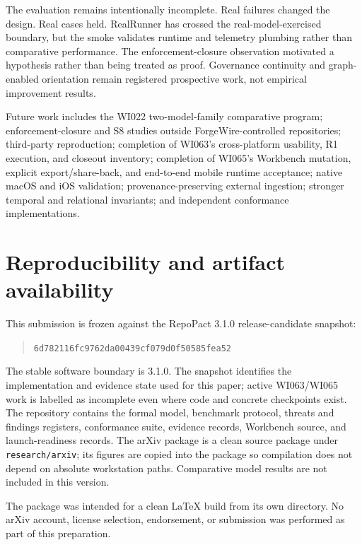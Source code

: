 \documentclass[11pt]{article}
\newcommand{\snapshot}{\texttt{6d782116fc9762da00439cf079d0f50585fea52}}
\begin{document}
The evaluation remains intentionally incomplete. Real failures changed the design. Real
cases held. RealRunner has crossed the real-model-exercised boundary, but the smoke validates
runtime and telemetry plumbing rather than comparative performance. The enforcement-closure
observation motivated a hypothesis rather than being treated as proof. Governance continuity
and graph-enabled orientation remain registered prospective work, not empirical improvement
results.

Future work includes the WI022 two-model-family comparative program; enforcement-closure and
S8 studies outside ForgeWire-controlled repositories; third-party reproduction; completion
of WI063's cross-platform usability, R1 execution, and closeout inventory; completion of
WI065's Workbench mutation, explicit export/share-back, and end-to-end mobile runtime
acceptance; native macOS and iOS validation; provenance-preserving external ingestion;
stronger temporal and relational invariants; and independent conformance implementations.

\section*{Reproducibility and artifact availability}

This submission is frozen against the RepoPact 3.1.0 release-candidate snapshot:
\begin{quote}\texttt{\scriptsize\snapshot}\end{quote}
The stable software boundary is 3.1.0. The snapshot identifies the implementation and
evidence state used for this paper; active WI063/WI065 work is labelled as incomplete even
where code and concrete checkpoints exist. The repository contains the formal model,
benchmark protocol, threats and findings registers, conformance suite, evidence records,
Workbench source, and launch-readiness records. The arXiv package is a clean source package
under \texttt{research/arxiv}; its
figures are copied into the package so compilation does not depend on absolute workstation
paths. Comparative model results are not included in this version.

The package was intended for a clean LaTeX build from its own directory. No arXiv account,
license selection, endorsement, or submission was performed as part of this preparation.

\nocite{agentsmd,memgpt,nygard,opa,conftest,evolutionary,backstage,swebench,sweevo}


\end{document}

